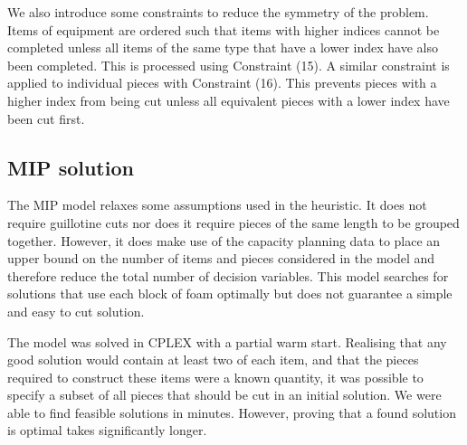 \documentclass[10pt,a4paper]{article}
\begin{document}
We also introduce some constraints to reduce the symmetry of the problem. Items of equipment are ordered such that items with higher indices cannot be completed unless all items of the same type that have a lower index have also been completed. This is processed using Constraint (15). A similar constraint is applied to individual pieces with Constraint (16). This prevents pieces with a higher index from being cut unless all equivalent pieces with a lower index have been cut first.

\begin{lpformulation}
\end{lpformulation}



\subsection{MIP solution}
The MIP model relaxes some assumptions used in the heuristic. It does not require guillotine cuts nor does it require pieces of the same length to be grouped together. However, it does make use of the capacity planning data to place an upper bound on the number of items and pieces considered in the model and therefore reduce the total number of decision variables. This model searches for solutions that use each block of foam optimally but does not guarantee a simple and easy to cut solution.

The model was solved in CPLEX with a partial warm start. Realising that any good solution would contain at least two of each item, and that the pieces required to construct these items were a known quantity, it was possible to specify a subset of all pieces that should be cut in an initial solution. We were able to find feasible solutions in minutes. However, proving that a found solution is optimal takes significantly longer. 
\end{document}
